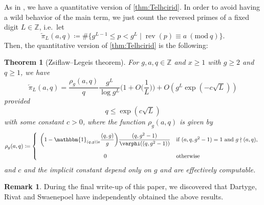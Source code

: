 \documentclass[hidelinks]{amsart}
\numberwithin{equation}{section}
\theoremstyle{plain}
\newtheorem{theorem}{Theorem}
\theoremstyle{definition}
\newtheorem*{remark*}{Remark}
\let\tmp\phi
\let\phi\varphi
\let\varphi\tmp
\let\tmp\epsilon
\let\epsilon\varepsilon
\let\varepsilon\tmp
\renewcommand{\mod}[1]{(\mathrm{mod}\ #1)}
\DeclareMathOperator{\rev}{rev}
\newcommand{\arev}{\overleftarrow}
\begin{document}
As in \cite{BhowmikSuzuki:Telhcirid},
we have a quantitative version of \cref{thm:Telhcirid}.
In order to avoid having a wild behavior of the main term,
we just count the reversed primes of a fixed digit $L\in\mathbb{Z}$,
i.e.\ let
\[
\arev{\pi}\!_{L}(a,q)
\coloneqq
\#\{g^{L-1}\le p<g^{L}\mid\rev(p)\equiv a\ \mod{q}\}.
\]
Then, the quantitative version of \cref{thm:Telhcirid} is the following:
\begin{theorem}[Zsiflaw--Legeis theorem]
\label{thm:Zsiflaw_Legeis}
For $g,a,q\in\mathbb{Z}$ and $x\ge1$ with $g\ge2$ and $q\ge1$, we have
\[
\overleftarrow{\pi}\!_{L}(a,q)
=
\frac{\rho_{g}(a,q)}{q}
\frac{g^{L}}{\log g^{L}}
\biggl(1+O\biggl(\frac{1}{L}\biggr)\biggr)
+
O(g^{L}\exp(-c\sqrt{L}))
\]
provided
\begin{equation}
\label{cor:ZsiflawLegeis:d_cond}
q
\le
\exp(c\sqrt{L})
\end{equation}
with some constant $c>0$, where the function $\rho_{g}(a,q)$ is given by
\[
\rho_{g}(a,q)
\coloneqq
\left\{
\begin{array}{>{\displaystyle}cl}
\biggl(
1
-
\mathbbm{1}_{(q,g)\mid a}
\frac{(q,g)}{g}
\biggr)
\frac{(q,g^{2}-1)}{\phi((q,g^{2}-1))}
&\text{if $(a,q,g^{2}-1)=1$ and $g\nmid (a,q)$},\\[6mm]
0&\text{otherwise}
\end{array}
\right.
\]
and $c$ and the implicit constant depend only on $g$ and are effectively computable.
\end{theorem}

\begin{remark*}
During the final write-up of this paper,
we discovered that Dartyge, Rivat and Swaenepoel \cite[Theorem~1.4]{DRS:BV}
have independently obtained the above results.
\end{remark*}
\end{document}
